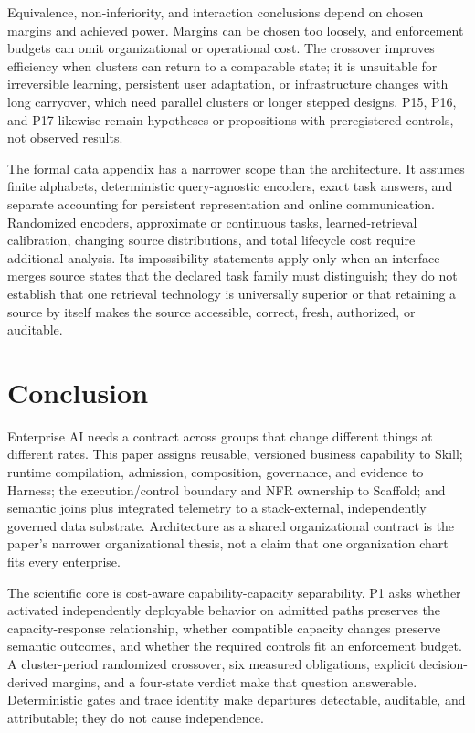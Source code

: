 \documentclass[11pt]{article}
\begin{document}
Equivalence, non-inferiority, and interaction conclusions depend on chosen margins and achieved power. Margins can be chosen too loosely, and enforcement budgets can omit organizational or operational cost. The crossover improves efficiency when clusters can return to a comparable state; it is unsuitable for irreversible learning, persistent user adaptation, or infrastructure changes with long carryover, which need parallel clusters or longer stepped designs. P15, P16, and P17 likewise remain hypotheses or propositions with preregistered controls, not observed results.

The formal data appendix has a narrower scope than the architecture. It assumes finite alphabets, deterministic query-agnostic encoders, exact task answers, and separate accounting for persistent representation and online communication. Randomized encoders, approximate or continuous tasks, learned-retrieval calibration, changing source distributions, and total lifecycle cost require additional analysis. Its impossibility statements apply only when an interface merges source states that the declared task family must distinguish; they do not establish that one retrieval technology is universally superior or that retaining a source by itself makes the source accessible, correct, fresh, authorized, or auditable.

\section{Conclusion}
\label{sec:conclusion}

Enterprise AI needs a contract across groups that change different things at different rates. This paper assigns reusable, versioned business capability to Skill; runtime compilation, admission, composition, governance, and evidence to Harness; the execution/control boundary and NFR ownership to Scaffold; and semantic joins plus integrated telemetry to a stack-external, independently governed data substrate. Architecture as a shared organizational contract is the paper's narrower organizational thesis, not a claim that one organization chart fits every enterprise.

The scientific core is cost-aware capability-capacity separability. P1 asks whether activated independently deployable behavior on admitted paths preserves the capacity-response relationship, whether compatible capacity changes preserve semantic outcomes, and whether the required controls fit an enforcement budget. A cluster-period randomized crossover, six measured obligations, explicit decision-derived margins, and a four-state verdict make that question answerable. Deterministic gates and trace identity make departures detectable, auditable, and attributable; they do not cause independence.
\end{document}
